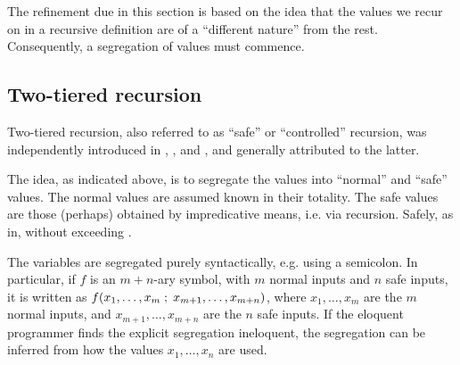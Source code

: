 
The refinement due in this section is based on the idea that the values we
recur on in a recursive definition are of a ``different nature'' from the
rest\cite{caseiro-1996}. Consequently, a segregation of values must commence.








\subsection{Two-tiered recursion}

Two-tiered recursion, also referred to as ``safe'' or ``controlled'' recursion,
was independently introduced in \cite{simmons-1988}, \cite{leivant-1990}, and
\cite{bellantoni-cook-1992}, and generally attributed to the latter.

The idea, as indicated above, is to segregate the values into ``normal'' and
``safe'' values. The normal values are assumed known in their totality. The
safe values are those (perhaps) obtained by impredicative means, i.e. via
recursion\cite{bellantoni-cook-1992, clote-1999}. Safely, as in, without
exceeding \FPTIME{}.

The variables are segregated purely syntactically, e.g. using a semicolon. In
particular, if $f$ is an $m+n$-ary symbol, with $m$ normal inputs and $n$ safe
inputs, it is written as $f{\mathopen{}\left({x_1,\ldots,x_m \mathrel{};\mathrel{}{} x_{m+1},\ldots,x_{m+n}}\right)\mathclose{}}$,
where $x_1,\ldots,x_m$ are the $m$ normal inputs, and $x_{m+1},\ldots,x_{m+n}$
are the $n$ safe inputs. If the eloquent programmer finds the explicit
segregation ineloquent, the segregation can be inferred from how the values
$x_1,\ldots,x_n$ are used\cite{caseiro-1996}.

